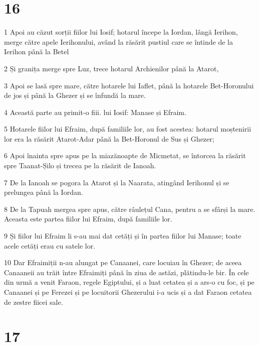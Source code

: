 \chapter{16}

\par 1 Apoi au căzut sorții fiilor lui Iosif; hotarul începe la Iordan, lângă Ierihon, merge către apele Ierihonului, având la răsărit pustiul care se întinde de la Ierihon până la Betel
\par 2 Și granița merge spre Luz, trece hotarul Archienilor până la Atarot,
\par 3 Apoi se lasă spre mare, către hotarele lui Iaflet, până la hotarele Bet-Horonului de jos și până la Ghezer și se înfundă la mare.
\par 4 Această parte au primit-o fiii. lui Iosif: Manase și Efraim.
\par 5 Hotarele fiilor lui Efraim, după familiile lor, au fost acestea: hotarul moștenirii lor era la răsărit Atarot-Adar până la Bet-Horonul de Sus și Ghezer;
\par 6 Apoi înainta spre apus pe la miazănoapte de Micmetat, se întorcea la răsărit spre Taanat-Șilo și trecea pe la răsărit de Ianoah.
\par 7 De la Ianoah se pogora la Atarot și la Naarata, atingând Ierihonul și se prelungea până la Iordan.
\par 8 De la Tapuah mergea spre apus, către râulețul Cana, pentru a se sfârși la mare. Aceasta este partea fiilor lui Efraim, după familiile lor.
\par 9 Și fiilor lui Efraim li s-au mai dat cetăți și în partea fiilor lui Manase; toate acele cetăți erau cu satele lor.
\par 10 Dar Efraimiții n-au alungat pe Canaanei, care locuiau în Ghezer; de aceea Canaaneii au trăit între Efraimiți până în ziua de astăzi, plătindu-le bir. În cele din urmă a venit Faraon, regele Egiptului, și a luat cetatea și a ars-o cu foc, și pe Canaanei și pe Ferezei și pe locuitorii Ghezerului i-a ucis și a dat Faraon cetatea de zestre fiicei sale.

\chapter{17}

